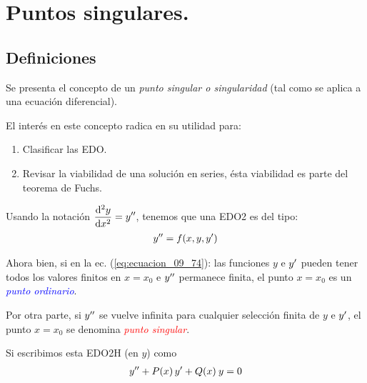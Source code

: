 \section{Puntos singulares.}
\subsection{Definiciones}


Se presenta el concepto de un \emph{punto singular o singularidad} (tal como se aplica a una ecuación diferencial).
\par
El interés en este concepto radica en su utilidad para:
\begin{enumerate}
\item Clasificar las EDO.
\item Revisar la viabilidad de una solución en series, ésta viabilidad es parte del teorema de Fuchs.
\end{enumerate}

Usando la notación $\displaystyle \dv[2]{y}{x} = {y}^{\prime \prime}$, tenemos que una EDO2 es del tipo:
\begin{align}
{y}^{\prime \prime} = f(x, y, {y}^{\prime})
\label{eq:ecuacion_09_74}
\end{align}

Ahora bien, si en la ec. (\ref{eq:ecuacion_09_74}): las funciones $y$ e ${y}^{\prime}$ pueden tener todos los valores finitos en $x = x_{0}$ e ${y}^{\prime \prime}$ permanece finita, el punto $x = x_{0}$ es un \emph{\textcolor{blue}{punto ordinario}}.
\par
Por otra parte, si ${y}^{\prime \prime}$ se vuelve infinita para cualquier selección finita de $y$ e  ${y}^{\prime}$, el punto $x = x_{0}$ se denomina \emph{\textcolor{red}{punto singular}}.
\par
Si escribimos esta EDO2H (en $y$) como
\begin{align}
{y}^{\prime \prime} + P(x) \, {y}^{\prime} + Q(x) \: y = 0
\label{eq:ecuacion_09_75}
\end{align}


